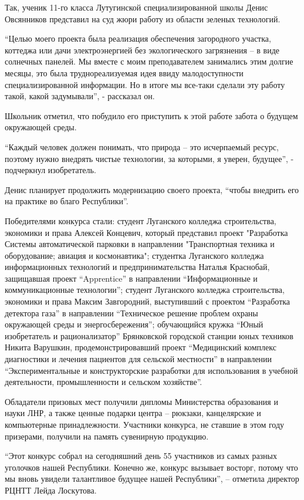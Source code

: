 Так, ученик 11-го класса Лутугинской специализированной школы Денис Овсянников
представил на суд жюри работу из области зеленых технологий.

\enquote{Целью моего проекта была реализация обеспечения загородного участка, коттеджа
или дачи электроэнергией без экологического загрязнения – в виде солнечных
панелей. Мы вместе с моим преподавателем занимались этим долгие месяцы, это
была труднореализуемая идея ввиду малодоступности специализированной
информации. Но в итоге мы все-таки сделали эту работу такой, какой задумывали},
- рассказал он.

Школьник отметил, что побудило его приступить к этой работе забота о будущем
окружающей среды.

\enquote{Каждый человек должен понимать, что природа – это исчерпаемый ресурс, поэтому
нужно внедрять чистые технологии, за которыми, я уверен, будущее}, - подчеркнул
изобретатель.

Денис планирует продолжить модернизацию своего проекта, \enquote{чтобы внедрить его на
практике во благо Республики}.

Победителями конкурса стали: студент Луганского колледжа строительства,
экономики и права Алексей Концевич, который представил проект "Разработка
Системы автоматической парковки в направлении "Транспортная техника и
оборудование; авиация и космонавтика"; студентка Луганского колледжа
информационных технологий и предпринимательства Наталья Краснобай, защищавшая
проект \enquote{Apprentice} в направлении \enquote{Информационные и коммуникационные
технологии}; студент Луганского колледжа строительства, экономики и права
Максим Завгородний, выступивший с проектом \enquote{Разработка детектора газа} в
направлении \enquote{Техническое решение проблем охраны окружающей среды и
энергосбережения}; обучающийся кружка \enquote{Юный изобретатель и рационализатор}
Брянковской городской станции юных техников Никита Варушкин,
продемонстрировавший проект \enquote{Медицинский комплекс диагностики и лечения
пациентов для сельской местности} в направлении \enquote{Экспериментальные и
конструкторские разработки для использования в учебной деятельности,
промышленности и сельском хозяйстве}.

Обладатели призовых мест получили дипломы Министерства образования и науки ЛНР,
а также ценные подарки центра – рюкзаки, канцелярские и компьютерные
принадлежности. Участники конкурса, не ставшие в этом году призерами, получили
на память сувенирную продукцию.

\enquote{Этот конкурс собрал на сегодняшний день 55 участников из самых разных
уголочков нашей Республики. Конечно же, конкурс вызывает восторг, потому что мы
вновь увидели талантливое будущее нашей Республики}, – отметила директор РЦНТТ
Лейда Лоскутова.

